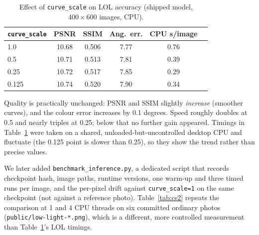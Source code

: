 \documentclass{article}
\newcommand{\code}[1]{\texttt{#1}}
\begin{document}
\begin{table}[!htbp]
\centering\small
\begin{tabular}{lccccc}
\toprule
\code{curve\_scale} & PSNR & SSIM & Ang.\ err. & CPU s/image\\
\midrule
1.0 & 10.68 & 0.506 & 7.77 & 0.76\\
0.5 & 10.71 & 0.513 & 7.81 & 0.39\\
0.25 & 10.72 & 0.517 & 7.85 & 0.29\\
0.125 & 10.74 & 0.520 & 7.90 & 0.34\\
\bottomrule
\end{tabular}
\caption{Effect of \code{curve\_scale} on LOL accuracy (shipped model, $400\times600$ images, CPU).}
\label{tab:cs}
\end{table}
Quality is practically unchanged: PSNR and SSIM slightly \emph{increase} (smoother curves), and the colour error increases by 0.1 degrees. Speed roughly doubles at 0.5 and nearly triples at 0.25; below that no further gain appeared. Timings in Table~\ref{tab:cs} were taken on a shared, unloaded-but-uncontrolled desktop CPU and fluctuate (the 0.125 point is slower than 0.25), so they show the trend rather than precise values.

We later added \code{benchmark\_inference.py}, a dedicated script that records checkpoint hash, image paths, runtime versions, one warm-up and three timed runs per image, and the per-pixel drift against \code{curve\_scale=1} on the same checkpoint (not against a reference photo). Table~\ref{tab:cs2} repeats the comparison at 1 and 4 CPU threads on six committed ordinary photos (\code{public/low-light-*.png}), which is a different, more controlled measurement than Table~\ref{tab:cs}'s LOL timings.
\end{document}
